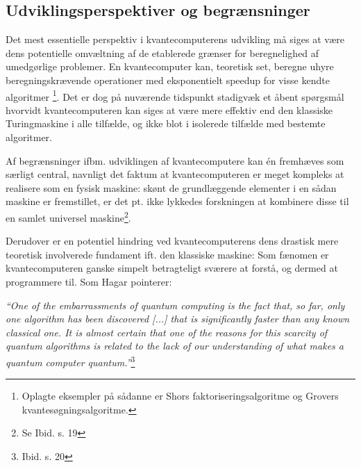 \documentclass[10pt,a4paper]{article}
\newcommand{\citat}[2]{\begin{justify}\textit{``#1''}\hspace{0.1cm}\footnote{#2}\end{justify}}
\begin{document}
\subsection{Udviklingsperspektiver og begrænsninger}
Det mest essentielle perspektiv i kvantecomputerens udvikling må siges at være 
dens potentielle omvæltning af de etablerede grænser for beregnelighed af 
umedgørlige problemer. En kvantecomputer kan, teoretisk set, beregne uhyre 
beregningskrævende operationer med eksponentielt speedup for visse kendte algoritmer \footnote{Oplagte eksempler på sådanne er Shors faktoriseringsalgoritme og
Grovers kvantesøgningsalgoritme.}. Det er dog på nuværende tidspunkt stadigvæk 
et åbent spørgsmål hvorvidt kvantecomputeren kan siges at være mere effektiv
end den klassiske Turingmaskine i alle tilfælde, og ikke blot i isolerede tilfælde
med bestemte algoritmer. 

Af begrænsninger ifbm. udviklingen af kvantecomputere kan én fremhæves som særligt
central, navnligt det faktum at kvantecomputeren er meget kompleks at realisere 
som en fysisk maskine: skønt de grundlæggende elementer i en sådan maskine er 
fremstillet, er det pt. ikke lykkedes forskningen at kombinere disse til en samlet
universel maskine\footnote{Se Ibid. s. 19}.

Derudover er en potentiel hindring ved kvantecomputerens dens drastisk mere 
teoretisk involverede fundament ift. den klassiske maskine:  
Som fænomen er kvantecomputeren ganske simpelt betragteligt sværere at forstå, 
og dermed at programmere til.
Som Hagar pointerer: 
\citat{One of the embarrassments of quantum computing is the fact that, so far, 
only one algorithm has been discovered [...] that is significantly faster than 
any \textit{known} classical one. It is almost certain that one of the reasons for
this scarcity of quantum algorithms is related to the lack of our understanding
of what makes a quantum computer quantum.}{Ibid. s. 20}
\end{document}
